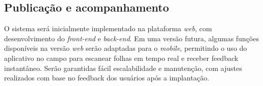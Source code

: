 \subsection{Publicação e acompanhamento}
O sistema será inicialmente implementado na plataforma \textit{web}, com desenvolvimento do \textit{front-end} e \textit{back-end}. Em uma versão futura, algumas funções disponíveis na versão \textit{web} serão adaptadas para o \textit{mobile}, permitindo o uso do aplicativo no campo para escanear folhas em tempo real e receber feedback instantâneo. Serão garantidas fácil escalabilidade e manutenção, com ajustes realizados com base no feedback dos usuários após a implantação.
